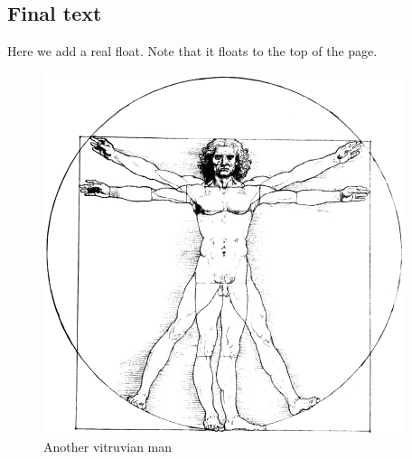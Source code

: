 \documentclass{book}
\begin{document}
\begin{commeditText}
  \section{Final text}


  Here we add a real float.  Note that it floats to the top of the
  page.

  \begin{figure}[t]
    \centering
    \includegraphics[width=.5\columnwidth]{vitruvian}    
    \caption{Another vitruvian man}
    \label{fig:vitruvian1}
  \end{figure}
\end{commeditText}
\end{document}
